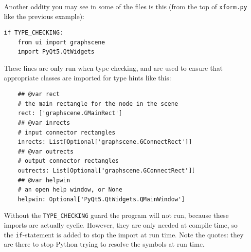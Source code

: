Another oddity you may see in some of the files is this (from the top
of \texttt{xform.py} like the previous example):
\begin{lstlisting}
if TYPE_CHECKING:
    from ui import graphscene
    import PyQt5.QtWidgets
\end{lstlisting}
These lines are only run when type checking, and are used to ensure
that appropriate classes are imported for type hints like this:
\begin{lstlisting}
    ## @var rect
    # the main rectangle for the node in the scene
    rect: ['graphscene.GMainRect']
    ## @var inrects
    # input connector rectangles
    inrects: List[Optional['graphscene.GConnectRect']]
    ## @var outrects
    # output connector rectangles
    outrects: List[Optional['graphscene.GConnectRect']]
    ## @var helpwin
    # an open help window, or None
    helpwin: Optional['PyQt5.QtWidgets.QMainWindow']
\end{lstlisting}
Without the \texttt{TYPE\_CHECKING} guard the program will not run, because
these imports are actually cyclic. However, they are only needed at 
compile time, so the \texttt{if}-statement is added to stop the import
at run time. Note the quotes: they are there to stop Python trying to
resolve the symbols at run time.

